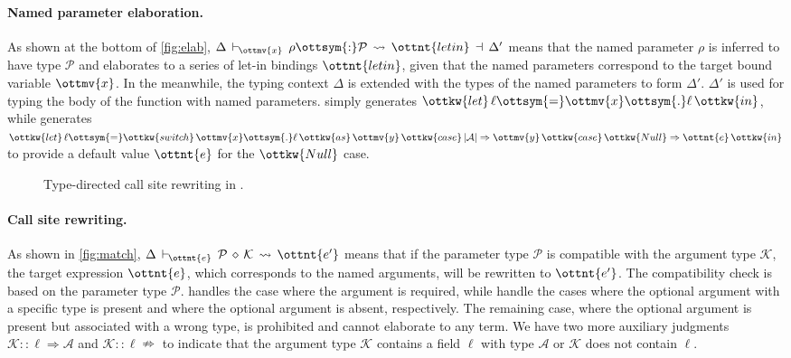 \paragraph{Named parameter elaboration.}
As shown at the bottom of \autoref{fig:elab},
$ \Delta \,\vdash\, _{\!\!\!\! \ottmv{x} }\:\: \rho \ottsym{:} \mathcal{P} \,\rightsquigarrow\, \ottnt{letin} \,\dashv\, \Delta' $ means that the named parameter
$\rho$ is inferred to have type $\mathcal{P}$ and elaborates to a series of let-in
bindings $\ottnt{letin}$, given that the named parameters correspond to the target
bound variable $\ottmv{x}$. In the meanwhile, the typing context $\Delta$ is extended
with the types of the named parameters to form $\Delta'$. $\Delta'$ is used for
typing the body of the function with named parameters. 
simply generates $\ottkw{let} \, \ell  \ottsym{=}  \ottmv{x}  \ottsym{.}  \ell \, \ottkw{in}$, while  generates
$\ottkw{let} \, \ell  \ottsym{=}  \ottkw{switch} \, \ottmv{x}  \ottsym{.}  \ell \, \ottkw{as} \, \ottmv{y} \, \ottkw{case} \, |  \mathcal{A}  |  \Rightarrow  \ottmv{y} \, \ottkw{case} \, \ottkw{Null}  \Rightarrow  \ottnt{e} \, \ottkw{in}$ to provide a
default value $\ottnt{e}$ for the $\ottkw{Null}$ case.

\begin{figure}
\IUdefnpmatch{}
\IUdefnlookup{}
\IUdefnlookdown{}
\caption{Type-directed call site rewriting in \uaena.} \label{fig:match}
\end{figure}

\paragraph{Call site rewriting.}
As shown in \autoref{fig:match},
$ \Delta \,\vdash\, _{\!\!\!\! \ottnt{e} }\:\: \mathcal{P} \,\diamond\, \mathcal{K} \,\rightsquigarrow\, \ottnt{e'} $ means that if the parameter type
$\mathcal{P}$ is compatible with the argument type $\mathcal{K}$, the target expression
$\ottnt{e}$, which corresponds to the named arguments, will be rewritten to
$\ottnt{e'}$. The compatibility check is based on the parameter type $\mathcal{P}$.
 handles the case where the argument is required, while
 handle the cases where the optional argument
with a specific type is present and where the optional argument is absent,
respectively. The remaining case, where the optional argument is present but
associated with a wrong type, is prohibited and cannot elaborate to any term.
We have two more auxiliary judgments $ \mathcal{K} :: \ell \Rightarrow \mathcal{A} $ and
$ \mathcal{K} :: \ell \nRightarrow $ to indicate that the argument type $\mathcal{K}$ contains a field $\ell$
with type $\mathcal{A}$ or $\mathcal{K}$ does not contain $\ell$.

